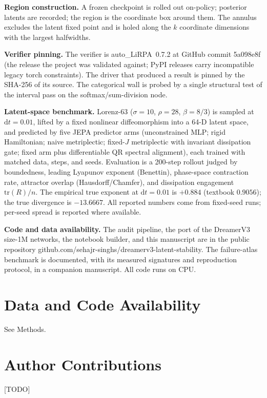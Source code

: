 \documentclass[11pt]{article}
\begin{document}
\textbf{Region construction.} A frozen checkpoint is rolled out on-policy;
posterior latents are recorded; the region is the coordinate box around
them. The annulus excludes the latent fixed point and is holed along the $k$
coordinate dimensions with the largest halfwidths.

\textbf{Verifier pinning.} The verifier is auto\_LiRPA~0.7.2 at GitHub commit
5a098e8f (the release the project was validated against; PyPI releases carry
incompatible legacy torch constraints). The driver that produced a result is
pinned by the SHA-256 of its source. The categorical wall is probed by a
single structural test of the interval pass on the softmax/sum-division node.

\textbf{Latent-space benchmark.} Lorenz-63 ($\sigma=10$, $\rho=28$,
$\beta=8/3$) is sampled at $\mathrm{d}t=0.01$, lifted by a fixed nonlinear
diffeomorphism into a 64-D latent space, and predicted by five JEPA
predictor arms (unconstrained MLP; rigid Hamiltonian; naive metriplectic;
fixed-$J$ metriplectic with invariant dissipation gate; fixed arm plus
differentiable QR spectral alignment), each trained with matched data,
steps, and seeds. Evaluation is a 200-step rollout judged by boundedness,
leading Lyapunov exponent (Benettin), phase-space contraction rate,
attractor overlap (Hausdorff/Chamfer), and dissipation engagement
$\mathrm{tr}(R)/n$. The empirical true exponent at $\mathrm{d}t=0.01$ is
$+0.884$ (textbook $0.9056$); the true divergence is $-13.6667$. All
reported numbers come from fixed-seed runs; per-seed spread is reported
where available.

\textbf{Code and data availability.} The audit pipeline, the port of the
DreamerV3 size-1M networks, the notebook builder, and this manuscript are in
the public repository
github.com/sehajr-singhs/dreamerv3-latent-stability. The failure-atlas
benchmark is documented, with its measured signatures and reproduction
protocol, in a companion manuscript. All code runs on CPU.

\section*{Data and Code Availability}
See Methods.

\section*{Author Contributions}
[TODO]
\end{document}
